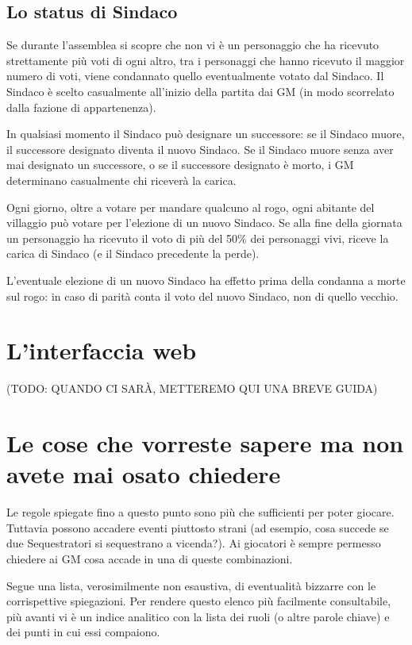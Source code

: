 \documentclass[a4paper,10pt]{article}
\begin{document}
\subsection{Lo status di Sindaco}
\label{sindaco}

Se durante l'assemblea si scopre che non vi è un personaggio che ha ricevuto
strettamente più voti di ogni altro, tra i personaggi che hanno ricevuto il
maggior numero di voti, viene condannato quello eventualmente votato dal
Sindaco.
Il Sindaco è scelto casualmente all'inizio della partita dai GM (in modo
scorrelato dalla fazione di appartenenza).

In qualsiasi momento il Sindaco può designare un successore: se il Sindaco
muore, il successore designato diventa il nuovo Sindaco. Se il Sindaco muore
senza aver mai designato un successore, o se il successore designato è morto, i
GM determinano casualmente chi riceverà la carica.

Ogni giorno, oltre a votare per mandare qualcuno al rogo, ogni abitante del
villaggio può votare per l'elezione di un nuovo Sindaco. Se alla fine della
giornata un personaggio ha ricevuto il voto di più del 50\% dei personaggi vivi,
riceve la carica di Sindaco (e il Sindaco precedente la perde).

L'eventuale elezione di un nuovo Sindaco ha effetto prima della condanna a morte
sul rogo: in caso di parità conta il voto del nuovo Sindaco, non di quello
vecchio.



\pagebreak
\section{L'interfaccia web}
(TODO: QUANDO CI SARÀ, METTEREMO QUI UNA BREVE GUIDA)


\pagebreak
\section{Le cose che vorreste sapere ma non avete mai osato chiedere}
\label{faq}

Le regole spiegate fino a questo punto sono più che sufficienti per poter
giocare. Tuttavia possono accadere eventi piuttosto strani (ad esempio, cosa
succede se due Sequestratori si sequestrano a vicenda?). Ai giocatori è sempre permesso
chiedere ai GM cosa accade in una di queste combinazioni.

Segue una lista, verosimilmente non esaustiva, di eventualità bizzarre con le
corrispettive spiegazioni.
Per rendere questo elenco più facilmente consultabile, più avanti vi è un indice
analitico con la lista dei ruoli (o altre parole chiave) e dei punti in cui essi
compaiono.
\end{document}
